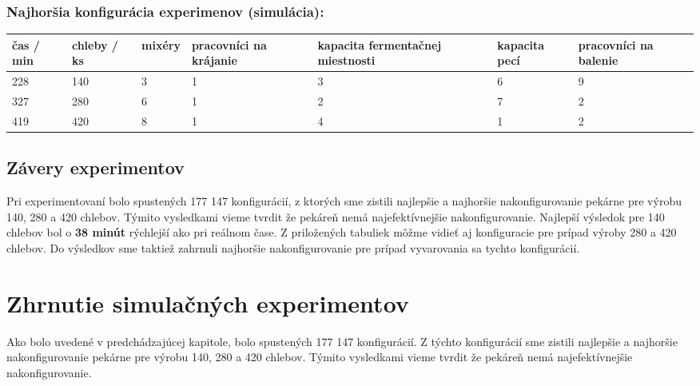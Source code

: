 \documentclass[a4paper, 10pt]{article}
\begin{document}
    \subsubsection{Najhoršia konfigurácia experimenov (simulácia):}
    \begin{center}
        \begin{tabular}{ |p{2cm}|p{2cm}|p{2cm}|p{2cm}|p{2cm}|p{2cm}|p{2cm}| }
            \hline
            čas / min & chleby / ks & mixéry & pracovníci na krájanie & kapacita fermentačnej miestnosti & kapacita pecí & pracovníci na balenie \\
            \hline\hline
            228 & 140 & 3 & 1 & 3 & 6 & 9  \\ \hline
            327 & 280 & 6 & 1 & 2 & 7 & 2 \\ \hline
            419 & 420 & 8 & 1 & 4 & 1 & 2 \\ \hline
        \end{tabular}
    \end{center}

    \subsection{Závery experimentov}
    Pri experimentovaní bolo spustených 177 147 konfigurácií, z ktorých sme zistili najlepšie a najhoršie nakonfigurovanie
    pekárne pre výrobu 140, 280 a 420 chlebov. Týmito vysledkami vieme tvrdit že pekáreň nemá najefektívnejšie nakonfigurovanie.
    Najlepší výsledok pre 140 chlebov bol o \textbf{38 minút} rýchlejší ako pri reálnom čase. Z priložených tabuliek
    môžme vidieť aj konfiguracie pre prípad výroby 280 a 420 chlebov. Do výsledkov sme taktiež zahrnuli najhoršie nakonfigurovanie
    pre prípad vyvarovania sa tychto konfigurácií.

    \section{Zhrnutie simulačných experimentov}
    Ako bolo uvedené v predchádzajúcej kapitole, bolo spustených 177 147 konfigurácií. Z týchto konfigurácií sme zistili
    najlepšie a najhoršie nakonfigurovanie pekárne pre výrobu 140, 280 a 420 chlebov.
    Týmito vysledkami vieme tvrdit že pekáreň nemá najefektívnejšie nakonfigurovanie.
    \newpage
    
    
\end{document}
